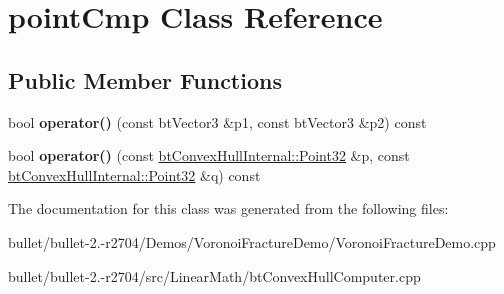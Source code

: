 \hypertarget{structpoint_cmp}{\section{point\+Cmp Class Reference}
\label{structpoint_cmp}
}
\subsection*{Public Member Functions}
\begin{DoxyCompactItemize}
\item 
\hypertarget{structpoint_cmp_a0ba9e663e591f65a07f7f38e35d781f8}{bool {\bfseries operator()} (const bt\+Vector3 \&p1, const bt\+Vector3 \&p2) const }\label{structpoint_cmp_a0ba9e663e591f65a07f7f38e35d781f8}

\item 
\hypertarget{structpoint_cmp_aa05d78d4c829246b9bffdf7b0f8c48b7}{bool {\bfseries operator()} (const \hyperlink{classbt_convex_hull_internal_1_1_point32}{bt\+Convex\+Hull\+Internal\+::\+Point32} \&p, const \hyperlink{classbt_convex_hull_internal_1_1_point32}{bt\+Convex\+Hull\+Internal\+::\+Point32} \&q) const }\label{structpoint_cmp_aa05d78d4c829246b9bffdf7b0f8c48b7}

\end{DoxyCompactItemize}


The documentation for this class was generated from the following files\+:\begin{DoxyCompactItemize}
\item 
bullet/bullet-\/2.-\/r2704/\+Demos/\+Voronoi\+Fracture\+Demo/Voronoi\+Fracture\+Demo.\+cpp\item 
bullet/bullet-\/2.-\/r2704/src/\+Linear\+Math/bt\+Convex\+Hull\+Computer.\+cpp\end{DoxyCompactItemize}
